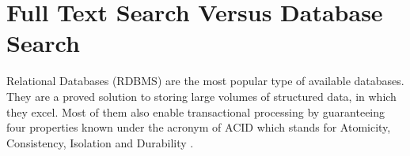 %
%
%
%
%
%
%
%
%
%
%
%
%
%
%
%
%

\section{Full Text Search Versus Database Search}
\label{sec:fullVsDb}



Relational Databases (RDBMS) are the most popular type of available databases. 
They are a proved solution to storing large volumes of structured data, in which they excel.
Most of them also enable transactional processing by guaranteeing four properties known under the acronym of ACID which stands for Atomicity, Consistency, Isolation and Durability \cite{Gray:dbTransactions}. 

